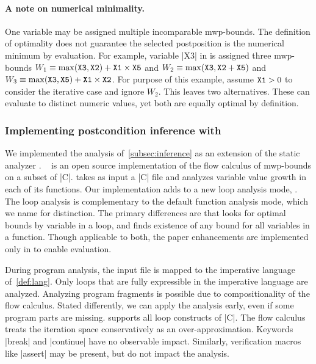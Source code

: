 \paragraph*{A note on numerical minimality.}
One variable may be assigned multiple incomparable mwp-bounds.
The definition of optimality does not guarantee the selected postposition is the numerical minimum by evaluation.
For example, variable \pr|X3| in \exname is assigned three mwp-bounds
\(W_1 \equiv \max(\prm{X3},\prm{X2})+\prm{X1} \times \prm{X5} \) and
\(W_2 \equiv \max(\prm{X3},\prm{X2}+\prm{X5}) \) and
\(W_3 \equiv \max(\prm{X3},\prm{X5})+\prm{X1} \times \prm{X2} \).
For purpose of this example, assume \(\prm{X1}>0\) to consider the iterative case and ignore \(W_2\).
This leaves two alternatives.
These can evaluate to distinct numeric values, yet both are equally optimal by definition.

\subsubsection{Implementing postcondition inference with \impl}
\label{subsec:implementation}

We implemented the analysis of~\autoref{subsec:inference} as an extension of the static analyzer .
~\cite{aubert2023b} is an open source implementation of the flow calculus of mwp-bounds on a subset of \pr|C|.
 takes as input a \pr|C| file and analyzes variable value growth in each of its functions.
Our implementation adds to  a new loop analysis mode, \ndx{\impl}.
The loop analysis is complementary to the default function analysis mode, which we name \ndx{\impf} for distinction.
The primary differences are that \ndx{\impl} looks for {optimal} bounds by variable in a {loop},
and \ndx{\impf} finds existence of {any} bound for all variables in a {function}.
Though applicable to both, the paper enhancements are implemented only in \ndx{\impl} to enable evaluation.

During program analysis, the input file is mapped to the imperative language of~\autoref{def:lang}.
Only loops that are fully expressible in the imperative language are analyzed.
Analyzing program fragments is possible due to compositionality of the flow calculus.
Stated differently, we can apply the analysis early, even if some program parts are missing.
 supports all loop constructs of \pr|C|.
The flow calculus treats the iteration space conservatively as an over-approximation.
Keywords \pr|break| and \pr|continue| have no observable impact.
Similarly, verification macros like \pr|assert| may be present, but do not impact the analysis.

